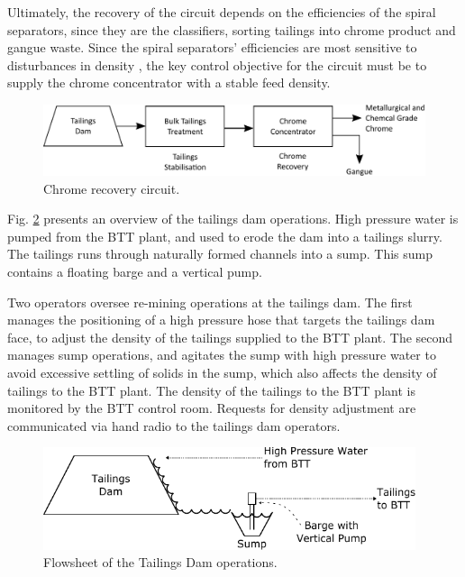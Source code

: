 \documentclass[preprint,authoryear,12pt]{elsarticle}
\begin{document}
Ultimately, the recovery of the circuit depends on the efficiencies of the spiral separators, since they are the classifiers, sorting tailings into chrome product and gangue waste. Since the spiral separators' efficiencies are most sensitive to disturbances in density \citep{HollandBatt1982}, the key control objective for the circuit must be to supply the chrome concentrator with a stable feed density.

\begin{figure}[h!]
	\centering
	\includegraphics[width=5.2in]{ChromeRecoveryFlowsheet.pdf}
	\caption{Chrome recovery circuit.}
	\label{fig:ChromeRecoveryFlowsheet}
\end{figure}
Fig. \ref{fig:TailingsDam} presents an overview of the tailings dam operations. High pressure water is pumped from the BTT plant, and used to erode the dam into a tailings slurry. The tailings runs through naturally formed channels into a sump. This sump contains a floating barge and a vertical pump. 

Two operators oversee re-mining operations at the tailings dam. The first manages the positioning of a high pressure hose that targets the tailings dam face, to adjust the density of the tailings supplied to the BTT plant. The second manages sump operations, and agitates the sump with high pressure water to avoid excessive settling of solids in the sump, which also affects the density of tailings to the BTT plant. The density of the tailings to the BTT plant is monitored by the BTT control room. Requests for density adjustment are communicated via hand radio to the tailings dam operators.

\begin{figure}[b!]
	\centering
	\includegraphics[width=4.3in]{TailingsDam.pdf}
	\caption{Flowsheet of the Tailings Dam operations.}
	\label{fig:TailingsDam}
\end{figure}
\end{document}
